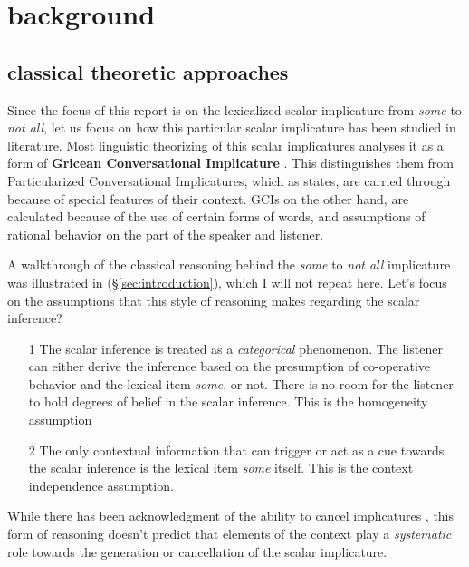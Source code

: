\documentclass[10pt, biblatex]{report}
\begin{document}
\section{background}
\label{sec:background}

\subsection{classical theoretic approaches}

Since the focus of this report is on the lexicalized scalar implicature from
\textit{some} to \textit{not all}, let us focus on how this particular scalar
implicature has been studied in literature. Most linguistic theorizing of this
scalar implicatures analyses it as a form of
\textbf{Gricean Conversational Implicature} \citep{grice_logic_1975,
horn_towards_1984, levinson2000presumptive}. This distinguishes them from
Particularized Conversational Implicatures, which as \citet{grice_logic_1975} states,
are carried through because of special features of their context. GCIs on the
other hand, are calculated because of the use of certain forms of words, and
assumptions of rational behavior on the part of the speaker and listener.

A walkthrough of the classical reasoning behind the \textit{some} to \textit{not
all} implicature was illustrated in (\S\ref{sec:introduction}), which
I will not repeat here. Let's focus on the assumptions that this style of
reasoning makes regarding the scalar inference?

\begin{enumerate}
    \item[1] The scalar inference is treated as a \textit{categorical}
             phenomenon. The listener can either derive the inference based on
             the presumption of co-operative behavior and the lexical item
             \textit{some}, or not. There is no room for the listener to
             hold degrees of belief in the scalar inference. This is the
             {\rmsc homogeneity} assumption
    \item[2] The only contextual information that can trigger or act as a cue
             towards the scalar inference is the lexical item \textit{some}
             itself. This is the {\rmsc context independence} assumption.
\end{enumerate}

While there has been acknowledgment of the ability to cancel implicatures
\citep{horn_towards_1984, levinson2000presumptive}, this form of reasoning
doesn't predict that elements of the context play a \textit{systematic} role
towards the generation or cancellation of the scalar implicature.
\end{document}
